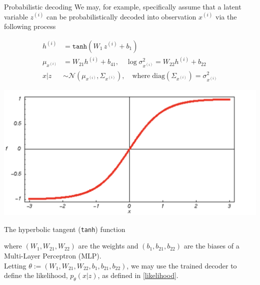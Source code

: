 \documentclass[10pt]{beamer}
\newcommand{\obs}{x^{(i)} }
\newcommand{\alatent}{z^{(i)} }
\newcommand{\N}{\mathcal{N}}
\begin{document}
\begin{frame}{Probabilistic decoding}
\footnotesize
We may, for example, specifically assume that a latent variable $\alatent$ can be probabilistically decoded into  observation $\obs$ via the following process

\begin{minipage}{.6\textwidth}
\begin{align*}
h^{(i)} &= \texttt{tanh} (W_1 \, \alatent + b_1) \\
\mu_{\obs}&= W_{21} h^{(i)} + b_{41}, \quad \log \sigma^2_{\obs} = W_{22}h^{(i)}+b_{22} \\
x|z &\sim \N(\mu_{\obs}, \Sigma_{\obs}), \quad \text{where} \; \text{diag}(\Sigma_{\obs}) = \sigma_{\obs}^2
\end{align*}
\end{minipage}
\hfill
\begin{minipage}{.3\textwidth}
\begin{center}
\includegraphics[width=.6\textwidth]{images/tanh}

The hyperbolic tangent (\texttt{tanh}) function
\end{center}
\end{minipage}



where $(W_1, W_{21}, W_{22})$ are the weights and $(b_1, b_{21}, b_{22})$ are the biases of a Multi-Layer Perceptron (MLP). \\
\vfill \pause 
 Letting $\theta := (W_1, W_{21}, W_{22}, b_1, b_{21}, b_{22})$, we may use the trained decoder to define the likelihood, $p_\theta(x |z )$, as defined in \eqref{likelihood}.

\end{frame}
\end{document}
